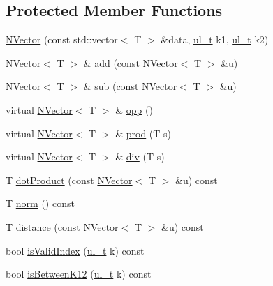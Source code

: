 \subsection*{Protected Member Functions}
\begin{DoxyCompactItemize}
\item 
\mbox{\hyperlink{class_n_vector_a402111a5a467efd5741e6a17fbd5c903}{N\+Vector}} (const std\+::vector$<$ T $>$ \&data, \mbox{\hyperlink{group___n_algebra_ga1b140a2034db3f5dfe18a987745df43a}{ul\+\_\+t}} k1, \mbox{\hyperlink{group___n_algebra_ga1b140a2034db3f5dfe18a987745df43a}{ul\+\_\+t}} k2)
\item 
\mbox{\hyperlink{class_n_vector}{N\+Vector}}$<$ T $>$ \& \mbox{\hyperlink{class_n_vector_a82d1863c00d57ccfed9e2d74a8d1bfd5}{add}} (const \mbox{\hyperlink{class_n_vector}{N\+Vector}}$<$ T $>$ \&u)
\item 
\mbox{\hyperlink{class_n_vector}{N\+Vector}}$<$ T $>$ \& \mbox{\hyperlink{class_n_vector_a67b62da878e1bfa873d714b87ae3d6ee}{sub}} (const \mbox{\hyperlink{class_n_vector}{N\+Vector}}$<$ T $>$ \&u)
\item 
virtual \mbox{\hyperlink{class_n_vector}{N\+Vector}}$<$ T $>$ \& \mbox{\hyperlink{class_n_vector_a92087679da6949a3fd0ce2c8329c5044}{opp}} ()
\item 
virtual \mbox{\hyperlink{class_n_vector}{N\+Vector}}$<$ T $>$ \& \mbox{\hyperlink{class_n_vector_a0b7f80da288093be295a09df9720bccc}{prod}} (T s)
\item 
virtual \mbox{\hyperlink{class_n_vector}{N\+Vector}}$<$ T $>$ \& \mbox{\hyperlink{class_n_vector_a3a9aa1000751225bc530490bde95b51e}{div}} (T s)
\item 
T \mbox{\hyperlink{class_n_vector_abd35a43ccd6973efe24624572570d99f}{dot\+Product}} (const \mbox{\hyperlink{class_n_vector}{N\+Vector}}$<$ T $>$ \&u) const
\item 
T \mbox{\hyperlink{class_n_vector_a99c134693de1e2b5f9d8f524d9cfd07a}{norm}} () const
\item 
T \mbox{\hyperlink{class_n_vector_aac9fc2b4c051f5011398a9fad6f7d452}{distance}} (const \mbox{\hyperlink{class_n_vector}{N\+Vector}}$<$ T $>$ \&u) const
\item 
bool \mbox{\hyperlink{class_n_vector_ad993b3d62002abc9d89ebf053003341d}{is\+Valid\+Index}} (\mbox{\hyperlink{group___n_algebra_ga1b140a2034db3f5dfe18a987745df43a}{ul\+\_\+t}} k) const
\item 
bool \mbox{\hyperlink{class_n_vector_a5c23df071f027cb26f1af69910159aa5}{is\+Between\+K12}} (\mbox{\hyperlink{group___n_algebra_ga1b140a2034db3f5dfe18a987745df43a}{ul\+\_\+t}} k) const

\end{DoxyCompactItemize}
